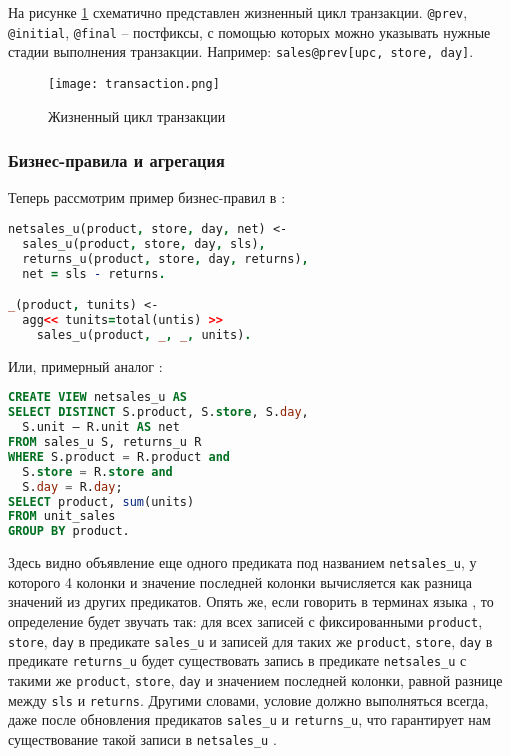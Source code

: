 На рисунке \ref{fig:technology:logiql:transaction} схематично представлен жизненный цикл транзакции. \lstinline{@prev}, \lstinline{@initial}, \lstinline{@final} – постфиксы, с помощью которых можно
указывать нужные стадии выполнения транзакции. Например:
\lstinline{sales@prev[upc, store, day]}.

\begin{figure}
	\centering
	\texttt{[image: transaction.png]}
	\caption{Жизненный цикл транзакции}
	\label{fig:technology:logiql:transaction}
\end{figure}

\subsubsection{Бизнес-правила и агрегация}
\label{sec:technology:logiql:aggregations}

Теперь рассмотрим пример бизнес-правил в \logiql:

\begin{lstlisting}[language=Prolog]
netsales_u(product, store, day, net) <-
  sales_u(product, store, day, sls),
  returns_u(product, store, day, returns),
  net = sls - returns.

_(product, tunits) <-
  agg<< tunits=total(untis) >>
    sales_u(product, _, _, units).
\end{lstlisting}

Или, примерный аналог \sql:

\begin{lstlisting}[language=SQL]
CREATE VIEW netsales_u AS
SELECT DISTINCT S.product, S.store, S.day,
  S.unit – R.unit AS net
FROM sales_u S, returns_u R
WHERE S.product = R.product and
  S.store = R.store and
  S.day = R.day;
SELECT product, sum(units)
FROM unit_sales
GROUP BY product.
\end{lstlisting}

Здесь видно объявление еще одного предиката под названием \lstinline{netsales_u}, у которого 4 колонки и значение последней колонки вычисляется как разница значений из других предикатов. Опять же, если говорить в терминах языка \logiql, то определение будет звучать так: для всех записей с фиксированными \lstinline{product}, \lstinline{store}, \lstinline{day} в предикате \lstinline{sales_u} и записей для таких же \lstinline{product}, \lstinline{store}, \lstinline{day} в предикате \lstinline{returns_u} будет существовать запись в предикате \lstinline{netsales_u} с такими же \lstinline{product}, \lstinline{store}, \lstinline{day} и значением последней колонки, равной разнице между \lstinline{sls} и \lstinline{returns}. Другими словами, условие должно выполняться всегда, даже после обновления предикатов \lstinline{sales_u} и \lstinline{returns_u}, что гарантирует нам существование такой записи в \lstinline{netsales_u} \cite{query_language_for_smart_db}.

